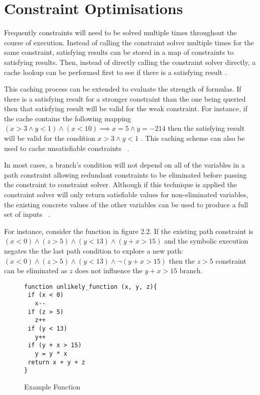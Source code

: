 \documentclass[]{final_report}
\begin{document}
\section{Constraint Optimisations}
Frequently constraints will need to be solved multiple times throughout the course of execution. Instead of calling the constraint solver multiple times for the same constraint, satisfying results can be stored in a map of constraints to satisfying results. Then, instead of directly calling the constraint solver directly, a cache lookup can be performed first to see if there is a satisfying result \cite{cadar2008klee}.

This caching process can be extended to evaluate the strength of formulas. If there is a satisfying result for a stronger constraint than the one being queried then that satisfying result will be valid for the weak constraint. For instance, if the cache contains the following mapping $ (x > 3 \land y <1) \land (x < 10) \implies x = 5 \land y =  -214$ then the satisfying result will be valid for the condition $x > 3 \land y < 1 $ . This caching scheme can also be used to cache unsatisfiable constraints ~\cite{cadar2008klee}.

In most cases, a branch's condition will not depend on all of the variables in a path constraint allowing redundant constraints to be eliminated before passing the constraint to constraint solver. Although if this technique is applied the constraint solver will only return satisfiable values for non-eliminated variables, the existing concrete values of the other variables can be used to produce a full set of inputs ~\cite{cadar2013symbolic}.

For instance, consider the function in figure 2.2. If the existing path constraint is  $(x < 0 ) \land ( z  > 5) \land (y < 13) \land (y + x > 15) $ and the symbolic execution negates the the last path condition to explore a new path:  $ (x < 0) \land (z > 5) \land (y < 13) \land \lnot(y + x > 15)$ then the  $z > 5$ constraint can be eliminated as $z$ does not influence the $y + x > 15$ branch.

\begin{figure}[h]
\begin{verbatim}
function unlikely_function (x, y, z){
 if (x < 0)
   x--
 if (z > 5)
   z++
 if (y < 13)
   y++
 if (y + x > 15)
   y = y * x
 return x + y + z
}
\end{verbatim}
\caption{\label{fig:example-function} Example Function}
\end{figure} 
\end{document}
